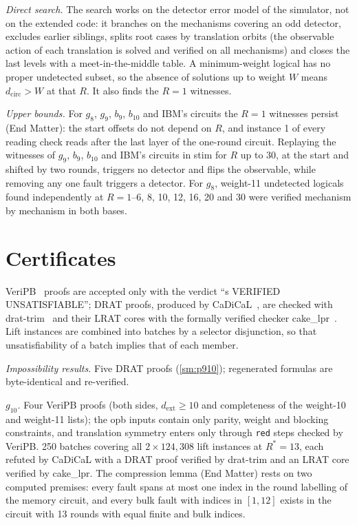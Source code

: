 \documentclass[aps,prl,twocolumn,superscriptaddress,nofootinbib]{revtex4-2}
\newif\ifshowclaimtags \showclaimtagsfalse
\newcommand{\cl}[1]{\ifshowclaimtags\textsuperscript{\textcolor{blue}{\scriptsize[#1]}}\fi}
\newcommand{\dcirc}{d_{\mathrm{circ}}}
\newcommand{\dext}{d_{\mathrm{ext}}}
\begin{document}
\emph{Direct search.} The search works on the detector error model of the simulator, not on
the extended code: it branches on the mechanisms covering an odd detector, excludes earlier
siblings, splits root cases by translation orbits (the observable action of each
translation is solved and verified on all mechanisms) and closes the last levels with a
meet-in-the-middle table. A minimum-weight logical has no proper undetected subset, so the
absence of solutions up to weight $W$ means $\dcirc>W$ at that $R$. It also finds the $R=1$
witnesses.

\emph{Upper bounds.} For $g_8$, $g_9$, $b_9$, $b_{10}$ and IBM's circuits the $R=1$
witnesses persist (End Matter): the start offsets do not depend on $R$, and instance 1 of
every reading check reads after the last layer of the one-round circuit. Replaying the
witnesses of $g_9$, $b_9$, $b_{10}$ and IBM's circuits in stim for $R$ up to 30, at the start
and shifted by two rounds, triggers no detector and flips the observable, while removing any
one fault triggers a detector. For $g_8$, weight-11 undetected logicals found independently
at $R=1$--6, 8, 10, 12, 16, 20 and 30 were verified mechanism by mechanism in both bases.

\section{Certificates}\label{sm:certs}\cl{L-15,L-25}
VeriPB~\cite{Bogaerts2023,GochtNordstrom2021} proofs are accepted only with the verdict
``s VERIFIED UNSATISFIABLE''; DRAT proofs, produced by CaDiCaL~\cite{CaDiCaL2024}, are
checked with drat-trim~\cite{DRATtrim2014} and their LRAT cores with the formally verified
checker cake\_lpr~\cite{Tan2021cakelpr}. Lift instances are combined into batches by a selector disjunction, so that
unsatisfiability of a batch implies that of each member.

\emph{Impossibility results.} Five DRAT proofs (\ref{sm:p910}); regenerated formulas are
byte-identical and re-verified.

\emph{$g_{10}$.} Four VeriPB proofs (both sides, $\dext\ge10$ and completeness of the
weight-10 and weight-11 lists); the opb inputs contain only parity, weight and blocking
constraints, and translation symmetry enters only through \texttt{red} steps checked by
VeriPB. 250 batches covering all $2\times124{,}308$ lift instances at $R^*=13$, each refuted
by CaDiCaL with a DRAT proof verified by drat-trim and an LRAT core verified by cake\_lpr.
The compression lemma (End Matter) rests on two computed premises: every fault spans at
most one index in the round labelling of the memory circuit, and every bulk fault with
indices in $[1,12]$ exists in the circuit with 13 rounds with equal finite and bulk indices.
\end{document}
